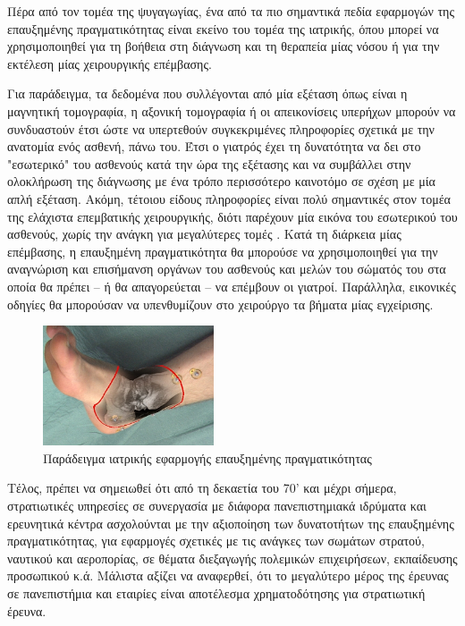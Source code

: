   



Πέρα από τον τομέα της ψυγαγωγίας, ένα από τα πιο σημαντικά πεδία εφαρμογών της επαυξημένης πραγματικότητας είναι εκείνο του τομέα της ιατρικής, όπου  μπορεί να χρησιμοποιηθεί για τη βοήθεια στη διάγνωση και τη θεραπεία μίας νόσου ή για την εκτέλεση μίας χειρουργικής επέμβασης. 


Για παράδειγμα, τα δεδομένα που συλλέγονται από μία εξέταση όπως είναι η μαγνητική τομογραφία, η αξονική τομογραφία ή οι απεικονίσεις υπερήχων μπορούν να συνδυαστούν έτσι ώστε να υπερτεθούν συγκεκριμένες πληροφορίες σχετικά με την ανατομία ενός ασθενή, πάνω του. Έτσι ο γιατρός έχει τη δυνατότητα να δει στο "εσωτερικό" του ασθενούς κατά την ώρα της εξέτασης και να συμβάλλει στην ολοκλήρωση της διάγνωσης με ένα τρόπο περισσότερο καινοτόμο σε σχέση με μία απλή εξέταση. Ακόμη, τέτοιου είδους πληροφορίες είναι πολύ σημαντικές στον τομέα της ελάχιστα επεμβατικής χειρουργικής, διότι παρέχουν μία εικόνα του εσωτερικού του ασθενούς, χωρίς την ανάγκη για μεγαλύτερες τομές \cite{fuchs1998augmented}. Κατά τη διάρκεια μίας επέμβασης, η επαυξημένη πραγματικότητα θα μπορούσε να χρησιμοποιηθεί για την αναγνώριση και επισήμανση οργάνων του ασθενούς και μελών του σώματός του στα οποία θα πρέπει – ή θα απαγορεύεται – να επέμβουν οι γιατροί. Παράλληλα, εικονικές οδηγίες θα μπορούσαν να υπενθυμίζουν στο χειρούργο τα βήματα μίας εγχείρισης.


\begin{figure}[H]
    \centering
    \includegraphics[width=0.45\textwidth]{Files/Figures/leg.jpg}
    \caption[Παράδειγμα ιατρικής εφαρμογής επαυξημένης πραγματικότητας]{Παράδειγμα ιατρικής εφαρμογής επαυξημένης πραγματικότητας}
    \label{fig:hud}
\end{figure}

Τέλος, πρέπει να σημειωθεί ότι από τη δεκαετία του 70' και μέχρι σήμερα, στρατιωτικές υπηρεσίες σε συνεργασία με διάφορα πανεπιστημιακά ιδρύματα και ερευνητικά κέντρα ασχολούνται με την αξιοποίηση των δυνατοτήτων της επαυξημένης πραγματικότητας, για εφαρμογές σχετικές με τις ανάγκες των σωμάτων στρατού, ναυτικού και αεροπορίας, σε θέματα διεξαγωγής πολεμικών επιχειρήσεων, εκπαίδευσης προσωπικού κ.ά. Μάλιστα αξίζει να αναφερθεί, ότι το μεγαλύτερο μέρος της έρευνας σε πανεπιστήμια και εταιρίες είναι αποτέλεσμα χρηματοδότησης για στρατιωτική έρευνα.


